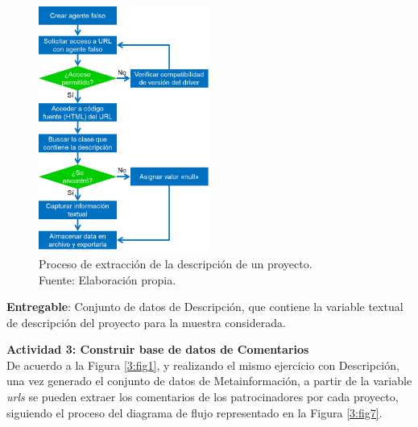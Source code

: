 \begin{figure}[h]
	\begin{center}
		\includegraphics[width=0.5\textwidth]{3/figures/diagrama_flujo_scrapping_descripcion.png}
		\caption[Proceso de extracción de la descripción de un proyecto]{Proceso de extracción de la descripción de un proyecto.\\
			Fuente: Elaboración propia.}
		\label{3:fig6}
	\end{center}
\end{figure}

\textbf{Entregable}: Conjunto de datos de Descripción, que contiene la variable textual de descripción del proyecto para la muestra considerada.

\textbf{Actividad 3: Construir base de datos de Comentarios}
\\
De acuerdo a la Figura \ref{3:fig1}, y realizando el mismo ejercicio con Descripción, una vez generado el conjunto de datos de Metainformación, a partir de la variable \textit{urls} se pueden extraer los comentarios de los patrocinadores por cada proyecto, siguiendo el proceso del diagrama de flujo representado en la Figura \ref{3:fig7}.

